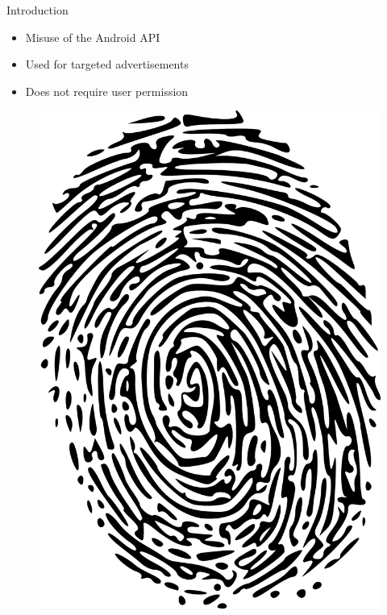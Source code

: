 \documentclass[aspectratio=169]{beamer}
[aspectratio=169] %
\begin{document}
\begin{frame}{Introduction}
  \begin{minipage}{0.49\textwidth} 
    \begin{itemize}
      \item Misuse of the Android API
      \pause
      \item Used for targeted advertisements
      \pause
      \item Does not require user permission
    \end{itemize}
  \end{minipage}
  \hfill
  \begin{minipage}{0.49\textwidth} 
    \begin{figure}
      \centering
      \includegraphics[height=0.5\textheight]{figures/fingerprint.png}
    \end{figure}
  \end{minipage}
\end{frame}
\end{document}
